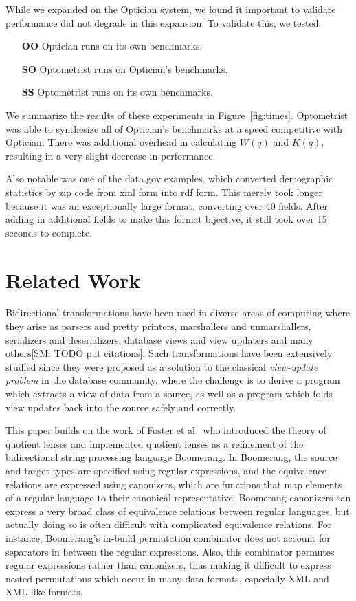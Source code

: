 \documentclass{svproc}
\newcommand{\FINISH}[3]{\ifdraft\textcolor{#1}{[#2: #3]}\fi}
\newcommand{\sam}[1]{\FINISH{dkpurple}{SM}{#1}}
\newcommand{\Name}{Optometrist}
\newcommand{\OpticianRuntime}{\textbf{OO}}
\newcommand{\SystemOnOptician}{\textbf{SO}}
\newcommand{\SystemOnBenchmarks}{\textbf{SS}}
\begin{document}
While we expanded on the Optician system, we found it important to validate
performance did not degrade in this expansion.  To validate this, we tested:
\begin{itemize}
\item[\OpticianRuntime{}] Optician runs on its own benchmarks.
\item[\SystemOnOptician{}] \Name{} runs on Optician's benchmarks.
\item[\SystemOnBenchmarks{}] \Name{} runs on its own benchmarks.
\end{itemize}

We summarize the results of these experiments in Figure~\ref{fig:times}.
\Name{} was
able to synthesize all of Optician's benchmarks at a speed competitive with
Optician.  There was additional overhead in calculating $W(q)$ and $K(q)$,
resulting in a very slight decrease in performance.

Also notable was one of the data.gov examples, which converted demographic
statistics by zip code from xml form into rdf form.  This merely took longer because it was
an exceptionally large format, converting over 40 fields.  After adding in additional
fields to make this format bijective, it still took over 15 seconds to complete.

\section{Related Work}
\label{relwork} 

Bidirectional transformations have been used in diverse areas of computing
where they arise as parsers and pretty printers, marshallers
and unmarshallers, serializers and deserializers, database views and view
updaters and many others\sam{TODO put citations}. Such transformations have
been extensively studied since they were proposed as a solution to the classical
{\em view-update problem} in the database community, where the challenge is to
derive a program which extracts a view of data from a source, as well as a
program which folds view updates back into the source safely and correctly.

This paper builds on the work of Foster et al~\cite{quotientlenses} who
introduced the theory of quotient lenses and implemented quotient lenses as a
refinement of the bidirectional string processing language Boomerang.
In Boomerang, the source and target types are specified using regular
expressions, and the equivalence relations are expressed using canonizers, which
are functions that map elements of a regular language to their canonical
representative. Boomerang canonizers can express a very broad class of
equivalence relations between regular languages, but actually doing so is often
difficult with complicated equivalence relations. For instance, Boomerang's
in-build permutation combinator does not account for separators in between the
regular expressions. Also, this combinator permutes regular expressions rather
than canonizers, thus making it difficult to express nested permutations which
occur in many data formats, especially XML and XML-like formats.
\end{document}
